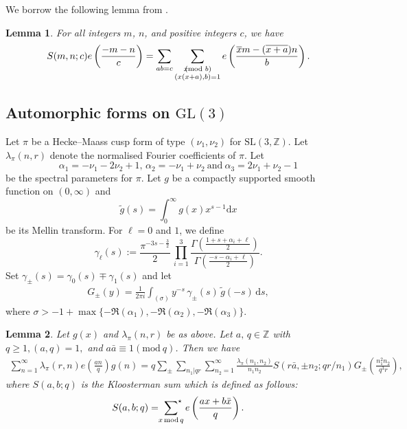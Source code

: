 \documentclass[12pt,a4paper,twoside, reqno]{amsart}
\newcommand{\shortmod}{\ensuremath{\negthickspace \negthickspace \negthickspace \pmod}}
\newcommand{\e}[2]{e\left(\frac{#1}{#2}\right)}
\newtheorem{lemma}{Lemma}
\begin{document}
    
We  borrow the following  lemma from  \cite{MY11}.
\begin{lemma} \label{matt lemma}
For all integers $m$, $n$, and positive integers $c$, we have
 \begin{equation}\label{eq:Stwist}
  S(m,n;c) \e{-m-n}{c} = \sum_{ab =c} \sum_{\substack{x \shortmod{b} \\ (x(x+a),b)=1}} \e{\overline{x} m - (\overline{x+a})n}{b}.
 \end{equation}
\end{lemma}

\subsection{Automorphic  forms on $\mathrm{GL(3)}$}
Let $\pi$ be a Hecke--Maass cusp form of type $(\nu_{1}, \nu_{2})$ for $\mathrm{SL(3, \mathbb{Z})}$. Let $\lambda_{\pi}(n,r)$ denote the normalised Fourier coefficients of $\pi$. Let 
\[ {\alpha}_{1} = - \nu_{1} - 2 \nu_{2}+1, \, {\alpha}_{2} = - \nu_{1}+ \nu_{2}  \ \mathrm{and} \ {\alpha}_{3} = 2 \nu_{1}+ \nu_{2}-1\]
be the spectral parameters for $\pi$.
Let $g$ be a compactly supported smooth function on  $ (0, \infty )$ and 
\[ \tilde{g}(s) = \int_{0}^{\infty} g(x) x^{s-1} \mathrm{d}x\]
 be its Mellin transform. For $\ell= 0$ and $1$, we define
\begin{equation}
	\gamma_{\ell}(s) :=  \frac{\pi^{-3s-\frac{3}{2}}}{2} \, \prod_{i=1}^{3} \frac{\Gamma\left(\frac{1+s+{\alpha}_{i}+ \ell}{2}\right)}{\Gamma\left(\frac{-s-{\alpha}_{i}+ \ell}{2}\right)}.
\end{equation}
Set $\gamma_{\pm}(s) = \gamma_{0}(s) \mp \gamma_{1}(s)$ and let 
\begin{align}\label{gl3 integral transform}
	G_{\pm}(y) = \frac{1}{2 \pi i} \int_{(\sigma)} y^{-s} \, \gamma_{\pm}(s) \, \tilde{g}(-s) \, \mathrm{d}s,
\end{align}
where $\sigma > -1 + \max \{-\Re({\alpha}_{1}), -\Re({ \alpha}_{2}), -\Re({\alpha}_{3})\}$. 
\begin{lemma} \label{gl3voronoi}
	Let $g(x)$ and  $\lambda_{\pi}(n,r)$ be as above. Let $a, \, q \in \mathbb{Z}$ with $q\geq 1, (a,q)=1,$ and  $a\bar{a} \equiv 1(\mathrm{mod} \ q)$. Then we have
	\begin{align*} \label{GL3-Voro}
		\sum_{n=1}^{\infty} \lambda_{\pi}(r,n) e\left(\frac{an}{q}\right) g(n) 
		=q  \sum_{\pm} \sum_{n_{1}|qr} \sum_{n_{2}=1}^{\infty}  \frac{\lambda_{\pi}(n_1,n_2)}{n_{1} n_{2}} S\left(r \bar{a}, \pm n_{2}; qr/n_{1}\right) G_{\pm} \left(\frac{n_{1}^2 n_{2}}{q^3 r}\right),
	\end{align*} 
	where  $S(a,b;q)$ is the  Kloosterman sum which is defined as follows:
	\[ S(a,b;q) = \sideset{}{^\star}{\sum}_{x \,{\mathrm{mod}}\,  q} e\left(\frac{ax+b\bar{x}}{q}\right).\]
\end{lemma}
\end{document}
